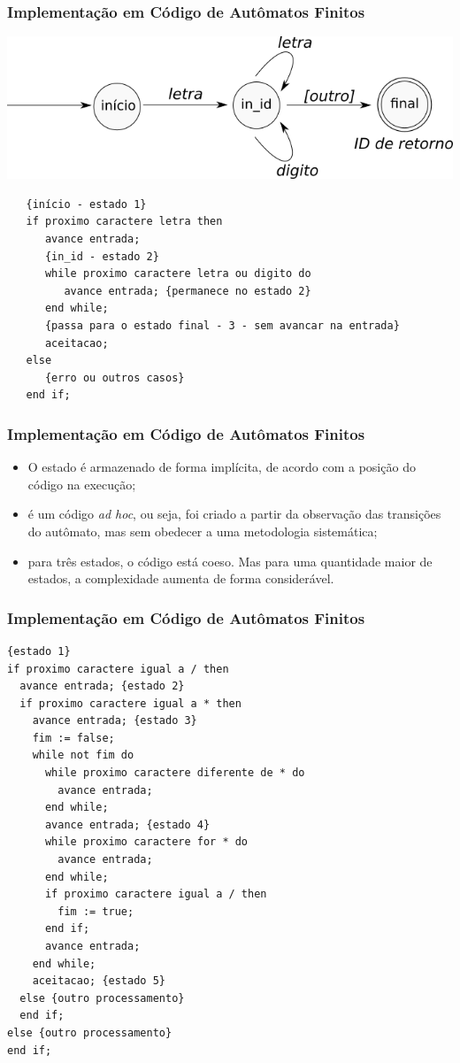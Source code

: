 \documentclass[table]{beamer}
\begin{document}
\begin{frame}[fragile]
   \frametitle{Implementação em Código de Autômatos Finitos}
   \includegraphics[width=\linewidth,height=\textheight,keepaspectratio]{figuras/automatodelimitador.png}
   \footnotesize
   \begin{verbatim}
   {início - estado 1}
   if proximo caractere letra then
      avance entrada;
      {in_id - estado 2}
      while proximo caractere letra ou digito do
         avance entrada; {permanece no estado 2}
      end while;
      {passa para o estado final - 3 - sem avancar na entrada}
      aceitacao;
   else
      {erro ou outros casos}
   end if;
   \end{verbatim}
\end{frame}

\begin{frame}
   \frametitle{Implementação em Código de Autômatos Finitos}
   \begin{itemize}
      \item O estado é armazenado de forma implícita, de acordo com a posição do código na execução;
      \item é um código \textit{ad hoc}, ou seja, foi criado a partir da observação das transições do autômato, mas sem obedecer a uma metodologia sistemática;
      \item para três estados, o código está coeso. Mas para uma quantidade maior de estados, a complexidade aumenta de forma considerável.
   \end{itemize}
\end{frame}

\begin{frame}[fragile]
   \frametitle{Implementação em Código de Autômatos Finitos}
   \scriptsize
   \begin{verbatim}
{estado 1}
if proximo caractere igual a / then
  avance entrada; {estado 2}
  if proximo caractere igual a * then
    avance entrada; {estado 3}
    fim := false;
    while not fim do
      while proximo caractere diferente de * do
        avance entrada;
      end while;
      avance entrada; {estado 4}
      while proximo caractere for * do
        avance entrada;
      end while;
      if proximo caractere igual a / then
        fim := true;
      end if;
      avance entrada;
    end while;
    aceitacao; {estado 5}
  else {outro processamento}  
  end if;
else {outro processamento}  
end if;
   \end{verbatim}
\end{frame}
\end{document}
